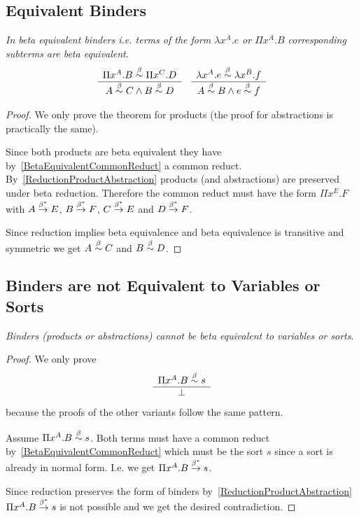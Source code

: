 \subsection{Equivalent Binders}

\begin{theorem}
    \label{EquivalentBinders}
    \emph{In beta equivalent binders i.e. terms of the form $\lambda x^A. e$ or
    $\Pi x^A.B$ corresponding subterms are beta equivalent}.
    $$
    \begin{array}{c} 
        \Pi x^A.B \stackrel{\beta}{\sim} \Pi x^C.D
     \\ \hline 
        A \stackrel{\beta}{\sim} C \land B \stackrel{\beta}{\sim} D
    \end{array}
    \quad
    \begin{array}{c} 
        \lambda x^A.e \stackrel{\beta}{\sim} \lambda x^B.f
     \\ \hline 
        A \stackrel{\beta}{\sim} B \land e \stackrel{\beta}{\sim} f
    \end{array}
    $$

    \begin{proof}
        We only prove the theorem for products (the proof for
        abstractions is practically the same).

        Since both products are beta equivalent they have
        by~\ref{BetaEquivalentCommonReduct} a common reduct.
        By~\ref{ReductionProductAbstraction} products (and abstractions) are
        preserved under beta reduction. Therefore the common reduct must have
        the form $\Pi x^E.F$ with $A \stackrel{\beta^*}{\to} E$, $B \stackrel{\beta^*}{\to} F$, $C
        \stackrel{\beta^*}{\to} E$ and $D \stackrel{\beta^*}{\to} F$.

        Since reduction implies beta equivalence and beta equivalence is
        transitive and symmetric we get $A \stackrel{\beta}{\sim} C$ and $B \stackrel{\beta}{\sim} D$.
    \end{proof}
\end{theorem}





\subsection{Binders are not Equivalent to Variables or Sorts}

\begin{theorem}
    \label{BinderNotEquivalentSortVariable}
    \emph{Binders (products or abstractions) cannot be beta equivalent to
    variables or sorts}.
    \begin{proof}
        We only prove
        $$
        \begin{array}{c} 
            \Pi x^A.B \stackrel{\beta}{\sim} s
         \\ \hline 
            \perp
        \end{array}
        $$
        because the proofs of the other variants follow the same pattern.

        Assume $\Pi x^A.B \stackrel{\beta}{\sim} s$. Both terms must have a common reduct
        by~\ref{BetaEquivalentCommonReduct} which must be the sort $s$ since a
        sort is already in normal form. I.e. we get $\Pi x^A.B \stackrel{\beta^*}{\to} s$.

        Since reduction preserves the form of binders
        by~\ref{ReductionProductAbstraction} $\Pi x^A.B \stackrel{\beta^*}{\to} s$ is not
        possible and we get the desired contradiction.
    \end{proof}
\end{theorem}
